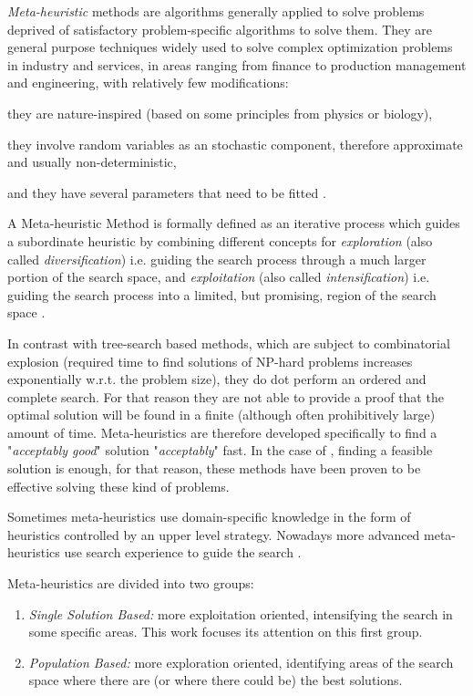 {\it Meta-heuristic} methods are algorithms generally applied to solve problems deprived of satisfactory problem-specific algorithms to solve them. They are general purpose techniques widely used to solve complex optimization problems in industry and services, in areas ranging from finance to production management and engineering, with relatively few modifications: \begin{inparaenum}[i)] \item they are nature-inspired (based on some principles from physics or biology), \item they involve random variables as an stochastic component, therefore approximate and usually non-deterministic, \item and they have several parameters that need to be fitted \cite{Dreo2006}.\end{inparaenum} 

A Meta-heuristic Method is formally defined as an iterative process which guides a subordinate heuristic by combining different concepts for \textit{exploration} (also called \textit{diversification}) i.e. guiding the search process through a much larger portion of the search space, and \textit{exploitation} (also called \textit{intensification}) i.e. guiding the search process into a limited, but promising, region of the search space \cite{Osman1996}.

In contrast with tree-search based methods, which are subject to combinatorial explosion (required time to find solutions of NP-hard problems increases exponentially w.r.t. the problem size), they do dot perform an ordered and complete search. For that reason they are not able to provide a proof that the optimal solution will be found in a finite (although often prohibitively large) amount of time. Meta-heuristics are therefore developed specifically to find a "\textit{acceptably good}" solution "\textit{acceptably}" fast. In the case of \csps, finding a feasible solution is enough, for that reason, these methods have been proven to be effective solving these kind of problems.

Sometimes meta-heuristics use domain-specific knowledge in the form of heuristics controlled by an upper level strategy. Nowadays more advanced meta-heuristics use search experience to guide the search \cite{Blum2003}.

Meta-heuristics are divided into two groups: %
\begin{enumerate}%
    \item {\it Single Solution Based:} more exploitation oriented, intensifying the search in some specific areas. This work focuses its attention on this first group.
    \item {\it Population Based:} more exploration oriented, identifying areas of the search space where there are (or where there could be) the best solutions. %
\end{enumerate} %

